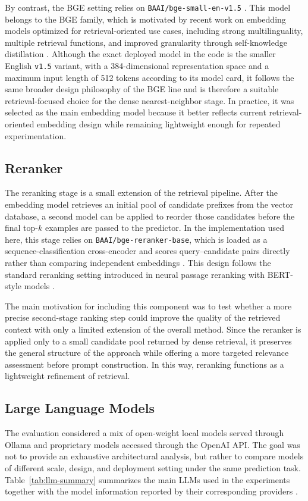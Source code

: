 By contrast, the BGE setting relies on \texttt{BAAI/bge-small-en-v1.5} \cite{bgesmallhf}. This model belongs to the BGE family, which is motivated by recent work on embedding models optimized for retrieval-oriented use cases, including strong multilinguality, multiple retrieval functions, and improved granularity through self-knowledge distillation \cite{bgem3paper}. Although the exact deployed model in the code is the smaller English \texttt{v1.5} variant, with a 384-dimensional representation space and a maximum input length of 512 tokens according to its model card, it follows the same broader design philosophy of the BGE line and is therefore a suitable retrieval-focused choice for the dense nearest-neighbor stage. In practice, it was selected as the main embedding model because it better reflects current retrieval-oriented embedding design while remaining lightweight enough for repeated experimentation.
\endgroup

\subsection{Reranker}
The reranking stage is a small extension of the retrieval pipeline. After the embedding model retrieves an initial pool of candidate prefixes from the vector database, a second model can be applied to reorder those candidates before the final top-$k$ examples are passed to the predictor. In the implementation used here, this stage relies on \texttt{BAAI/bge-reranker-base}, which is loaded as a sequence-classification cross-encoder and scores query--candidate pairs directly rather than comparing independent embeddings \cite{bgererankerhf}. This design follows the standard reranking setting introduced in neural passage reranking with BERT-style models \cite{nogueira2019bert}.

The main motivation for including this component was to test whether a more precise second-stage ranking step could improve the quality of the retrieved context with only a limited extension of the overall method. Since the reranker is applied only to a small candidate pool returned by dense retrieval, it preserves the general structure of the approach while offering a more targeted relevance assessment before prompt construction. In this way, reranking functions as a lightweight refinement of retrieval.

\subsection{Large Language Models}
The evaluation considered a mix of open-weight local models served through Ollama and proprietary models accessed through the OpenAI API. The goal was not to provide an exhaustive architectural analysis, but rather to compare models of different scale, design, and deployment setting under the same prediction task. Table~\ref{tab:llm-summary} summarizes the main LLMs used in the experiments together with the model information reported by their corresponding providers \cite{casciani2026rag,ollama_deepseek32b,ollama_gemma34b,ollama_gptoss20b,ollama_mistralsmall32_24b,ollama_phi414b,ollama_qwen330b,openai_gpt4omini,openai_gpt41mini}.

